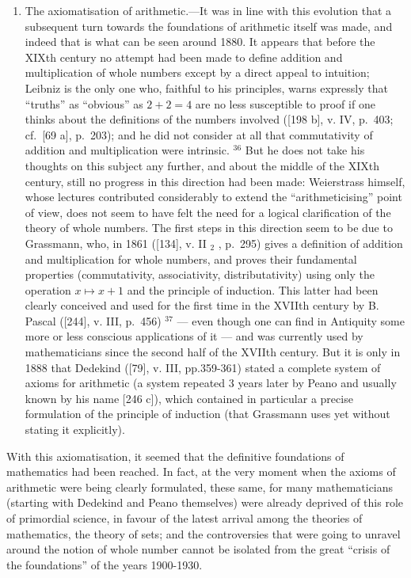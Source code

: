 \begin{enumerate}
\def\labelenumi{\Alph{enumi})}
\setcounter{enumi}{3}
\tightlist
\item
  The axiomatisation of arithmetic.---It was in line with this evolution that a subsequent turn towards the foundations of arithmetic itself was made, and indeed that is what can be seen around 1880. It appears that before the XIXth century no attempt had been made to define addition and multiplication of whole numbers except by a direct appeal to intuition; Leibniz is the only one who, faithful to his principles, warns expressly that ``truths'' as ``obvious'' as \(2 + 2 = 4\) are no less susceptible to proof if one thinks about the definitions of the numbers involved ({[}198 b{]}, v. IV, p.~403; cf.~{[}69 a{]}, p.~203); and he did not consider at all that commutativity of addition and multiplication were intrinsic. \(^{36}\) But he does not take his thoughts on this subject any further, and about the middle of the XIXth century, still no progress in this direction had been made: Weierstrass himself, whose lectures contributed considerably to extend the ``arithmeticising'' point of view, does not seem to have felt the need for a logical clarification of the theory of whole numbers. The first steps in this direction seem to be due to Grassmann, who, in 1861 ({[}134{]}, v. II \(_{2}\) , p.~295) gives a definition of addition and multiplication for whole numbers, and proves their fundamental properties (commutativity, associativity, distributativity) using only the operation \(x \mapsto x + 1\) and the principle of induction. This latter had been clearly conceived and used for the first time in the XVIIth century by B. Pascal ({[}244{]}, v. III, p.~456) \(^{37}\) --- even though one can find in Antiquity some more or less conscious applications of it --- and was currently used by mathematicians since the second half of the XVIIth century. But it is only in 1888 that Dedekind ({[}79{]}, v. III, pp.359-361) stated a complete system of axioms for arithmetic (a system repeated 3 years later by Peano and usually known by his name {[}246 c{]}), which contained in particular a precise formulation of the principle of induction (that Grassmann uses yet without stating it explicitly).
\end{enumerate}

With this axiomatisation, it seemed that the definitive foundations of mathematics had been reached. In fact, at the very moment when the axioms of arithmetic were being clearly formulated, these same, for many mathematicians (starting with Dedekind and Peano themselves) were already deprived of this role of primordial science, in favour of the latest arrival among the theories of mathematics, the theory of sets; and the controversies that were going to unravel around the notion of whole number cannot be isolated from the great ``crisis of the foundations'' of the years 1900-1930.
\relax{}
